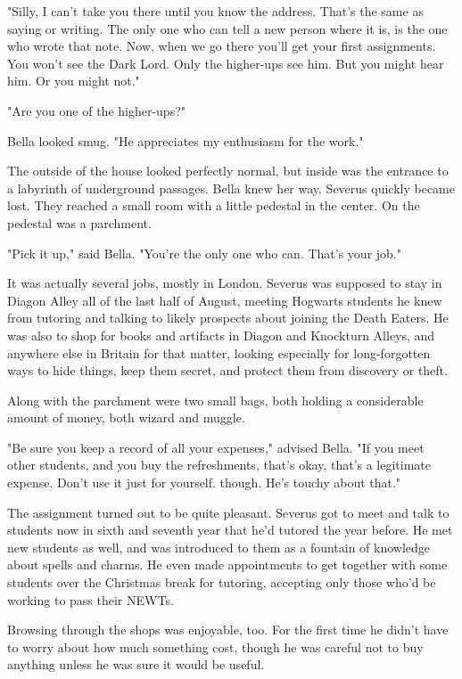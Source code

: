 \documentclass[a4paper,11pt]{article}
\begin{document}
"Silly, I can't take you there until you know the address. That's the same as saying or writing. The only one who can tell a new person where it is, is the one who wrote that note. Now, when we go there you'll get your first assignments. You won't see the Dark Lord. Only the higher-ups see him. But you might hear him. Or you might not."

"Are you one of the higher-ups?"

Bella looked smug. "He appreciates my enthusiasm for the work."

The outside of the house looked perfectly normal, but inside was the entrance to a labyrinth of underground passages. Bella knew her way. Severus quickly became lost. They reached a small room with a little pedestal in the center. On the pedestal was a parchment.

"Pick it up," said Bella. "You're the only one who can. That's your job."

It was actually several jobs, mostly in London. Severus was supposed to stay in Diagon Alley all of the last half of August, meeting Hogwarts students he knew from tutoring and talking to likely prospects about joining the Death Eaters. He was also to shop for books and artifacts in Diagon and Knockturn Alleys, and anywhere else in Britain for that matter, looking especially for long-forgotten ways to hide things, keep them secret, and protect them from discovery or theft.

Along with the parchment were two small bags, both holding a considerable amount of money, both wizard and muggle.

"Be sure you keep a record of all your expenses," advised Bella. "If you meet other students, and you buy the refreshments, that's okay, that's a legitimate expense. Don't use it just for yourself. though. He's touchy about that."

The assignment turned out to be quite pleasant. Severus got to meet and talk to students now in sixth and seventh year that he'd tutored the year before. He met new students as well, and was introduced to them as a fountain of knowledge about spells and charms. He even made appointments to get together with some students over the Christmas break for tutoring, accepting only those who'd be working to pass their NEWTs.

Browsing through the shops was enjoyable, too. For the first time he didn't have to worry about how much something cost, though he was careful not to buy anything unless he was sure it would be useful.
\end{document}
